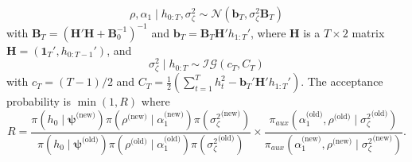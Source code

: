 \documentclass[
  12pt,
]{book}
\theoremstyle{break}
\theoremstyle{nonumberplain}
\begin{document}
\begin{enumerate}
\[
\rho,\alpha_1\mid h_{0:T},\sigma^{2}_{\zeta}\sim\mathcal{N}(\boldsymbol{b}_{T},\sigma^{2}_{\zeta}\boldsymbol{B}_{T})
\]
with $\boldsymbol{B}_{T}=(\boldsymbol{H}'\boldsymbol{H}+\boldsymbol{B}_{0}^{-1})^{-1}$ and $\boldsymbol{b}_{T}=\boldsymbol{B}_{T}\boldsymbol{H}'h_{1:T}'$, where $\boldsymbol{H}$ is a $T \times 2$ matrix $\boldsymbol{H}=(\boldsymbol{1}_{T}',h_{0:T-1}')$, and 
\[
\sigma^{2}_{\zeta}\mid h_{0:T}\sim \mathcal{IG}(c_{T},C_{T})
\]
with $c_{T}=(T-1)/2$ and $C_T=\frac{1}{2}(\sum_{t=1}^{T}h_{t}^{2}-\boldsymbol{b}_{T}'\boldsymbol{H}'h_{1:T}')$. The acceptance probability is $\min(1,R)$ where
\[
R = \frac{\pi(h_0\mid \boldsymbol{\psi}^{\text{(new)}})\pi(\rho^{\text{(new)}}\mid \alpha_1^{\text{(new)}})\pi({\sigma^{2}_{\zeta}}^{\text{(new)}})}{\pi(h_0\mid \boldsymbol{\psi}^{\text{(old)}})\pi(\rho^{\text{(old)}}\mid \alpha_1^{\text{(old)}})\pi({\sigma^{2}_{\zeta}}^{\text{(old)}})} \times \frac{\pi_{aux}(\alpha_1^{\text{(old)}},\rho^{\text{(old)}}\mid {\sigma^{2}_{\zeta}}^{\text{(old)}})}{\pi_{aux}(\alpha_1^{\text{(new)}},\rho^{\text{(new)}}\mid {\sigma^{2}_{\zeta}}^{\text{(new)}})}.
\]


\end{enumerate}
\end{document}

